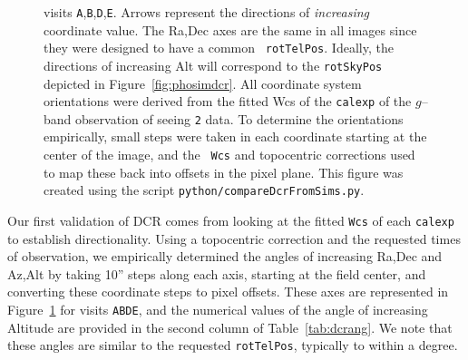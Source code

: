 \documentclass[DM,toc]{lsstdoc}
\def\A{{\tt A}}
\def\B{{\tt B}}
\def\D{{\tt D}}
\def\E{{\tt E}}
\begin{document}
\begin{figure}
{      visits \A,\B,\D,\E.  Arrows represent the directions of {\it
        increasing} coordinate value.  The Ra,Dec axes are the same in
      all images since they were designed to have a common {\tt
        rotTelPos}.  Ideally, the directions of increasing Alt will
      correspond to the {\tt rotSkyPos} depicted in
      Figure~\ref{fig:phosimdcr}.  All coordinate system orientations
      were derived from the fitted Wcs of the {\tt calexp} of the
      $g$--band observation of seeing {\tt 2} data.  To determine the
      orientations empirically, small steps were taken in each
      coordinate starting at the center of the image, and the {\tt
        Wcs} and topocentric corrections used to map these back into
      offsets in the pixel plane.  This figure was created using the
      script {\tt python/compareDcrFromSims.py}.}
    \label{fig:wcsdcr}
\end{figure}

Our first validation of DCR comes from looking at the fitted {\tt Wcs}
of each {\tt calexp} to establish directionality.  Using a topocentric
correction and the requested times of observation, we empirically
determined the angles of increasing Ra,Dec and Az,Alt by taking 10''
steps along each axis, starting at the field center, and converting
these coordinate steps to pixel offsets.  These axes are represented
in Figure~\ref{fig:wcsdcr} for visits \A\B\D\E, and the numerical
values of the angle of increasing Altitude are provided in the second
column of Table~\ref{tab:dcrang}.  We note that these angles are
similar to the requested {\tt rotTelPos}, typically to within a
degree.
\end{document}
